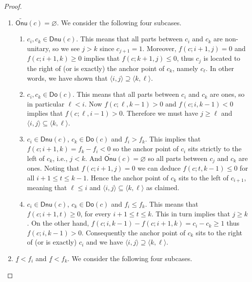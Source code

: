 \documentclass[reqno]{amsart}
\numberwithin{equation}{section}
\theoremstyle{definition}
\theoremstyle{named}
\def\Onu{\mathsf{Onu}}
\def\Dnu{\mathsf{Dnu}}
\def\Do{\mathsf{Do}}
\def\tonu{\widetilde{\Onu}}
\def\uf{\underline{f}}
\begin{document}
\begin{proof}
\begin{enumerate}[font=\bfseries]
    \item[case 1]$\tonu(c)= \varnothing$. We consider the following four subcases.
    \begin{enumerate}
		\item $c_i,c_k\in\Dnu(c)$. This means that all parts between $c_i$ and $c_k$ are non-unitary, so we see $j>k$ since $c_{j+1}=1$. Moreover, $f(c;i+1,j)=0$ and $f(c;i+1,k)\ge 0$ implies that $f(c;k+1,j)\le 0$, thus $c_j$ is located to the right of (or is exactly) the anchor point of $c_k$, namely $c_{\ell}$. In other words, we have shown that $\langle i,j\rangle\supseteq \langle k,\ell\rangle$.
		\item $c_i,c_k\in\Do(c)$. This means that all parts between $c_i$ and $c_k$ are ones, so in particular $\ell<i$. Now $f(c;\ell,k-1)>0$ and $f(c;i,k-1)<0$ implies that $f(c;\ell,i-1)>0$. Therefore we must have $j\ge \ell$ and $\langle i,j\rangle\subseteq \langle k,\ell\rangle$.
		\item $c_i\in\Dnu(c)$, $c_k\in\Do(c)$ and $f_i>f_k$. This implies that $f(c;i+1,k)=f_k-f_i<0$ so the anchor point of $c_i$ sits strictly to the left of $c_k$, i.e., $j<k$. And $\tonu(c)=\varnothing$ so all parts between $c_j$ and $c_k$ are ones. Noting that $f(c;i+1,j)=0$ we can deduce $f(c;t,k-1)\le 0$ for all $i+1\le t\le k-1$. Hence the anchor point of $c_k$ sits to the left of $c_{i+1}$, meaning that $\ell\le i$ and $\langle i,j\rangle\subseteq \langle k,\ell\rangle$ as claimed.
		\item $c_i\in\Dnu(c)$, $c_k\in\Do(c)$ and $f_i\le f_k$. This means that $f(c;i+1,t)\ge 0$, for every $i+1\le t\le k$. This in turn implies that $j\ge k$. On the other hand, $f(c;i,k-1)-f(c;i+1,k)=c_i-c_k\ge 1$ thus $f(c;i,k-1)>0$. Consequently the anchor point of $c_k$ sits to the right of (or is exactly) $c_i$ and we have $\langle i,j\rangle\supseteq \langle k,\ell\rangle$.
	\end{enumerate}
	\item[case 2]$\uf< f_i$ and $\uf<f_k$. We consider the following four subcases.
\end{enumerate}
\end{proof}
\end{document}
